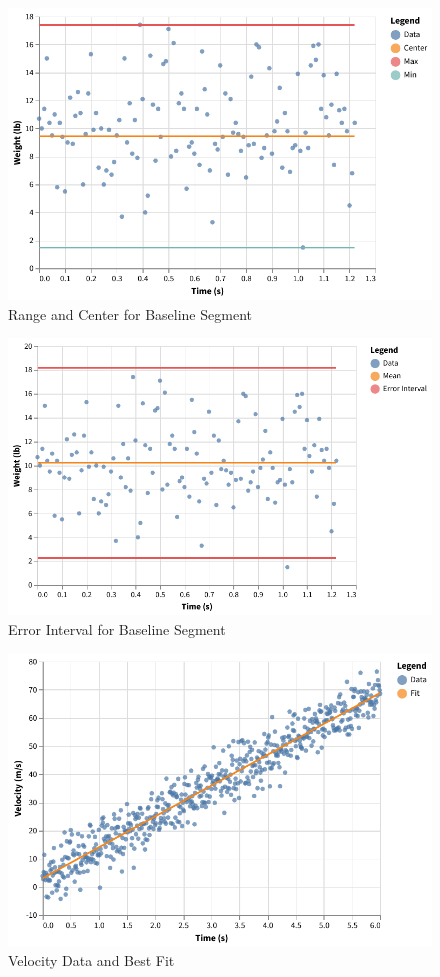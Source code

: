 %
\begin{figure}[ht]
    \centering
    \includegraphics{chart/00-intro/baseline-min-center-max.pdf}
    \caption{Range and Center for Baseline Segment}
    \label{figure:00.baseline.center}
\end{figure}
%
\begin{figure}[ht]
    \centering
    \includegraphics{chart/00-intro/baseline-error-interval.pdf}
    \caption{Error Interval for Baseline Segment}
    \label{figure:00.baseline.interval}
\end{figure}
%
\begin{figure}[ht]
    \centering
    \includegraphics{chart/00-intro/velocity-fit.pdf}
    \caption{Velocity Data and Best Fit}
    \label{figure:00.velocity.fit}
\end{figure}
%
